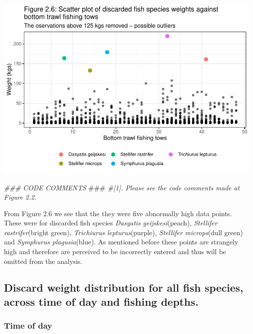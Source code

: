 \documentclass[
]{book}
\newenvironment{Shaded}{\begin{snugshade}}{\end{snugshade}}
\newcommand{\AlertTok}[1]{\textcolor[rgb]{0.94,0.16,0.16}{#1}}
\newcommand{\CommentTok}[1]{\textcolor[rgb]{0.56,0.35,0.01}{\textit{#1}}}
\begin{document}
\begin{center}\includegraphics{bookdown-demo_files/figure-latex/unnamed-chunk-18-1} \end{center}

\begin{Shaded}
\begin{Highlighting}[]
\CommentTok{### CODE COMMENTS }\AlertTok{###}
\CommentTok{#[1]. Please see the code comments made at Figure 2.2.  }
\end{Highlighting}
\end{Shaded}

From Figure 2.6 we see that the they were five abnormally high data points. These were for discarded fish species \emph{Dasyatis geijskesi}(peach), \emph{Stellifer rastrifer}(bright green), \emph{Trichiurus lepturus}(purple), \emph{Stellifer microps}(dull green) and \emph{Symphurus plagusia}(blue). As mentioned before these points are strangely high and therefore are perceived to be incorrectly entered and thus will be omitted from the analysis.

\hypertarget{discard-weight-distribution-for-all-fish-species-across-time-of-day-and-fishing-depths.}{%
\subsection{Discard weight distribution for all fish species, across time of day and fishing depths.}\label{discard-weight-distribution-for-all-fish-species-across-time-of-day-and-fishing-depths.}}

\hypertarget{time-of-day}{%
\subsubsection{Time of day}\label{time-of-day}}
\end{document}
